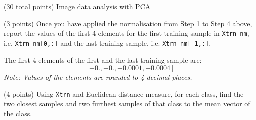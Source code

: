 \documentclass[12pt]{article}
\begin{document}
\clearpage
%
%

\begin{question}{(30 total points) Image data analysis with PCA}

  
  

  
  \medskip

  \begin{subquestion}{(3 points)
      Once you have applied the normalisation from Step 1 to Step 4 above,
      report the values of the first 4 elements for the first training
      sample in \texttt{Xtrn\_nm},
      i.e. \texttt{Xtrn\_nm[0,:]} and the last training sample,
      i.e. \texttt{Xtrn\_nm[-1,:]}.
    } \label{Q1.1}
    

      \begin{answerbox}{10em}
         The first 4 elements of the first and the last training sample are:
         $$[-0.    , -0.    , -0.0001, -0.0004]$$
         \newline
         \textit{Note: Values of the elements are rounded to 4 decimal places.}
      \end{answerbox}
  


   \end{subquestion}
   \begin{subquestion}{(4 points)
      Using {\tt Xtrn} and Euclidean distance
      measure, for each class,
      find the two closest samples and two furthest
      samples of that class to the mean vector of the class.
    }  \label{Q1.2}





\end{subquestion}
\end{question}
\end{document}
